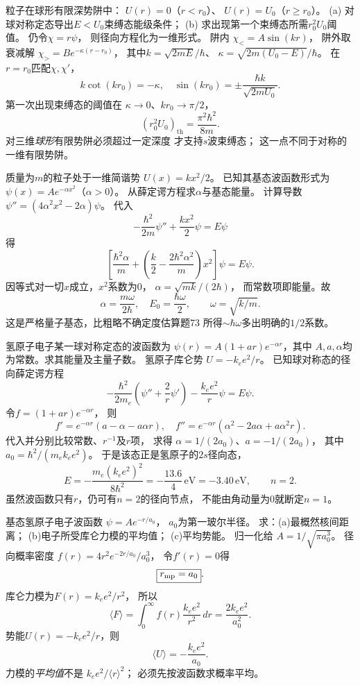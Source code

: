 粒子在球形有限深势阱中：
$U(r)=0$（$r<r_0$）、
$U(r)=U_0$（$r\ge r_0$）。
(a) 对球对称定态导出$E<U_0$束缚态能级条件；
(b) 求出现第一个束缚态所需$r_0^2U_0$阈值。
\exsolution
仍令$\chi=r\psi$，
则径向方程化为一维形式。
阱内
$\chi_<=A\sin(kr)$，
阱外取衰减解
$\chi_>=B e^{-\kappa(r-r_0)}$，
其中$k=\sqrt{2mE}/\hbar$、
$\kappa=\sqrt{2m(U_0-E)}/\hbar$。
在$r=r_0$匹配$\chi,\chi'$，
\[
 \boxed{k\cot(kr_0)=-\kappa},
 \quad
 \boxed{\sin(kr_0)=\pm\frac{\hbar k}{\sqrt{2mU_0}}}.
\]
第一次出现束缚态的阈值在
$\kappa\to0$、$kr_0\to\pi/2$，
\[
 \boxed{(r_0^2U_0)_{\mathrm{th}}=
 \frac{\pi^2\hbar^2}{8m}}.
\]
\excheck 对三维\emph{球形}有限势阱必须超过一定深度
才支持$s$波束缚态；
这一点不同于对称的一维有限势阱。

质量为$m$的粒子处于一维简谐势
$U(x)=kx^2/2$。
已知其基态波函数形式为
$\psi(x)=A e^{-\alpha x^2}$（$\alpha>0$）。
从薛定谔方程求$\alpha$与基态能量。
\exsolution
计算导数
$\psi''=(4\alpha^2x^2-2\alpha)\psi$。
代入
\[
 -\frac{\hbar^2}{2m}\psi''+\frac{kx^2}{2}\psi=E\psi
\]
得
\[
 \left[\frac{\hbar^2\alpha}{m}
 +\left(\frac k2-\frac{2\hbar^2\alpha^2}{m}\right)x^2\right]\psi
 =E\psi.
\]
因等式对一切$x$成立，$x^2$系数为0，
$\alpha=\sqrt{mk}/(2\hbar)$，
而常数项即能量。故
\[
 \boxed{\alpha=\frac{m\omega}{2\hbar}},\quad
 \boxed{E_0=\frac{\hbar\omega}{2}},
 \qquad \omega=\sqrt{k/m}.
\]
\excheck 这是严格量子基态，比粗略不确定度估算题73
所得$\sim\hbar\omega$多出明确的$1/2$系数。

氢原子电子某一球对称定态的波函数为
$\psi(r)=A(1+ar)e^{-\alpha r}$，其中
$A,a,\alpha$均为常数。求其能量及主量子数。
\exsolution
氢原子库仑势
$U=-k_ee^2/r$。
已知球对称态的径向薛定谔方程
\[
 -\frac{\hbar^2}{2m_e}
 \left(\psi''+\frac2r\psi'\right)
 -\frac{k_ee^2}{r}\psi=E\psi.
\]
令$f=(1+ar)e^{-\alpha r}$，
则
\[
 f'=e^{-\alpha r}(a-\alpha-a\alpha r),\quad
 f''=e^{-\alpha r}(\alpha^2-2a\alpha+a\alpha^2r).
\]
代入并分别比较常数、$r^{-1}$及$r$项，
求得
$\alpha=1/(2a_0)$、$a=-1/(2a_0)$，
其中$a_0=\hbar^2/(m_ek_ee^2)$。
于是该态正是氢原子的$2s$径向态，
\[
 \boxed{E=-\frac{m_e(k_ee^2)^2}{8\hbar^2}
 =-\frac{13.6}{4}\,\mathrm{eV}=-3.40\,\mathrm{eV}},
 \qquad\boxed{n=2}.
\]
\excheck 虽然波函数只有$r$，仍可有$n=2$的径向节点，
不能由角动量为0就断定$n=1$。

基态氢原子电子波函数
$\psi=Ae^{-r/a_0}$，
$a_0$为第一玻尔半径。
求：(a)最概然核间距离；
(b)电子所受库仑力模的平均值；
(c)平均势能。
\exsolution
归一化给
$A=1/\sqrt{\pi a_0^3}$。
径向概率密度
$f(r)=4r^2e^{-2r/a_0}/a_0^3$，
令$f'(r)=0$得
\[
 \boxed{r_{\rm mp}=a_0}.
\]
库仑力模为$F(r)=k_ee^2/r^2$，
所以
\[
 \langle F\rangle=
 \int_0^\infty f(r)\frac{k_ee^2}{r^2}\,dr
 =\boxed{\frac{2k_ee^2}{a_0^2}}.
\]
势能$U(r)=-k_ee^2/r$，则
\[
 \boxed{\langle U\rangle=
 -\frac{k_ee^2}{a_0}}.
\]
\excheck 力模的\emph{平均值}不是
$k_ee^2/\langle r\rangle^2$；
必须先按波函数求概率平均。

